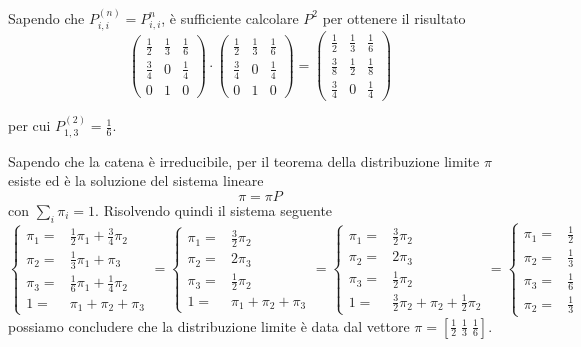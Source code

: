 \documentclass{homework}
\begin{document}
\exercise*[1.b] \label{1b}
Sapendo che $P_{i, i}^{(n)} = P_{i,i}^n$, è sufficiente calcolare $P^{2}$ per ottenere il risultato
\begin{equation}
    \begin{pmatrix}
    \frac{1}{2} & \frac{1}{3} & \frac{1}{6}\\[1ex] 
    \frac{3}{4} &     0       & \frac{1}{4}\\[1ex] 
     0          &     1       &     0
    \end{pmatrix}
    \cdot
    \begin{pmatrix}
    \frac{1}{2} & \frac{1}{3} & \frac{1}{6}\\[1ex] 
    \frac{3}{4} &     0       & \frac{1}{4}\\[1ex] 
     0          &     1       &     0
    \end{pmatrix}
    =
    \begin{pmatrix}
    \frac{1}{2} & \frac{1}{3} & \frac{1}{6}\\[1ex] 
    \frac{3}{8} & \frac{1}{2} & \frac{1}{8}\\[1ex] 
    \frac{3}{4} &     0       & \frac{1}{4}
    \end{pmatrix}
\end{equation}

per cui $P^{(2)}_{1, 3} = \frac{1}{6}$. 



\exercise*[1.c] \label{1c}
Sapendo che la catena è irreducibile, per il teorema della distribuzione limite $\pi$ esiste ed è la soluzione del sistema lineare
\[
\pi = \pi P
\]
con $\sum_i \pi_i = 1$. Risolvendo quindi il sistema seguente
\[
\begin{cases}
\pi_1=&\frac{1}{2}\pi_1 + \frac{3}{4}\pi_2\\ 
\pi_2=&\frac{1}{3}\pi_1 + \pi_3\\ 
\pi_3=&\frac{1}{6}\pi_1 + \frac{1}{4}\pi_2\\ 
1=& \pi_1 + \pi_2 + \pi_3 
\end{cases}
= \begin{cases}
\pi_1=&\frac{3}{2}\pi_2\\ 
\pi_2=&2\pi_3\\
\pi_3=&\frac{1}{2}\pi_2\\ 
1=& \pi_1 + \pi_2 + \pi_3 
\end{cases}= \begin{cases}
\pi_1=&\frac{3}{2}\pi_2\\ 
\pi_2=&2\pi_3\\
\pi_3=&\frac{1}{2}\pi_2\\ 
1=& \frac{3}{2}\pi_2 + \pi_2 + \frac{1}{2}\pi_2 
\end{cases}= \begin{cases}
\pi_1=&\frac{1}{2}\\
\pi_2=&\frac{1}{3}\\
\pi_3=&\frac{1}{6}\\ 
\pi_2=&\frac{1}{3} 
\end{cases}
\]
possiamo concludere che la distribuzione limite è data dal vettore $\pi = \left[ \frac{1}{2} \; \frac{1}{3} \; \frac{1}{6} \right]$.
\end{document}
